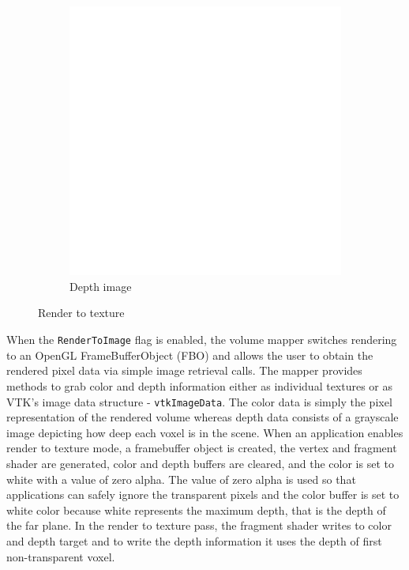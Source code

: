 \begin{figure}[ht]
\begin{subfigure}[b]{.5\columnwidth}
    \includegraphics[width=\textwidth]{depthimage.png}
    \caption{Depth image}
    \label{fig:rendertotexturedepth}
  \end{subfigure}
  \caption{Render to texture}
  \label{fig:rendertotexture}
\end{figure}

When the \texttt{RenderToImage} flag is enabled, the volume mapper switches
rendering to an OpenGL FrameBufferObject (FBO) and allows the user to obtain the
rendered pixel data via simple image retrieval calls. The mapper provides
methods to grab color and depth information either as individual textures or as
VTK's image data structure - \texttt{vtkImageData}. The color data is simply the
pixel representation of the rendered volume whereas depth data consists of a
grayscale image depicting how deep each voxel is in the scene. When an
application enables render to texture mode, a framebuffer object is created, the
vertex and fragment shader are generated, color and depth buffers are cleared,
and the color is set to white with a value of zero alpha. The value of zero
alpha is used so that applications can safely ignore the transparent pixels and
the color buffer is set to white color because white represents the maximum
depth, that is the depth of the far plane. In the render to texture pass, the
fragment shader writes to color and depth target and to write the depth
information it uses the depth of first non-transparent voxel.

